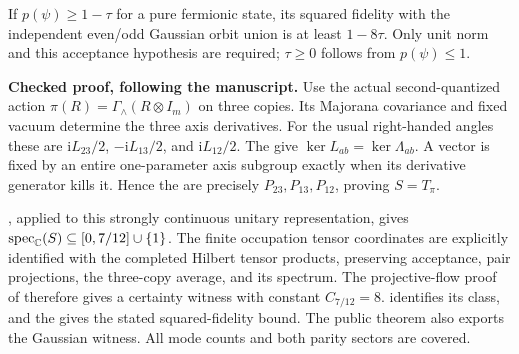 \begin{theorem}\label{thm:main-fermions}
  \leanok
  \par
  If $p(\psi)\ge1-\tau$ for a pure fermionic state, its squared fidelity
  with the independent even/odd Gaussian orbit union is at least $1-8\tau$.
  Only unit norm and this acceptance hypothesis are required; $\tau\ge0$
  follows from $p(\psi)\le1$.

  \textbf{Checked proof, following the manuscript.} Use the actual
  second-quantized action $\pi(R)=\Gamma_\wedge(R\otimes I_m)$ on three copies.
  Its Majorana covariance and fixed vacuum determine the three axis
  derivatives. For the usual right-handed angles these are
  $\mathrm{i}L_{23}/2$, $-\mathrm{i}L_{13}/2$, and $\mathrm{i}L_{12}/2$.
  The 
  give $\ker L_{ab}=\ker\Lambda_{ab}$. A vector is fixed by an entire
  one-parameter axis subgroup exactly when its derivative generator kills it.
  Hence the 
  are precisely $P_{23},P_{13},P_{12}$, proving $S=T_\pi$.

  , applied to this strongly continuous unitary
  representation, gives $\operatorname{spec}_{\mathbb{C}}(S)\subseteq[0,7/12]\cup\{1\}$.
  The finite occupation tensor coordinates are explicitly identified with
  the completed Hilbert tensor products, preserving acceptance, pair
  projections, the three-copy average, and its spectrum.
  The projective-flow proof of  therefore gives a
  certainty witness with constant $C_{7/12}=8$.
   identifies its class, and the
   gives the stated squared-fidelity
  bound. The public theorem also exports the Gaussian witness.
  All mode counts and both parity sectors are covered.
\end{theorem}

